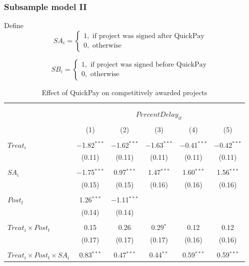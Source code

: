 \documentclass[
]{article}
\begin{document}
\hypertarget{subsample-model-ii}{%
\subsubsection{Subsample model II}\label{subsample-model-ii}}

Define
\[ SA_i = \begin{cases} 1, \text{ if project was signed after QuickPay}\\
0, \text{ otherwise} \end{cases}\]

\[ SB_i = \begin{cases} 1, \text{ if project was signed before QuickPay}\\
0, \text{ otherwise} \end{cases}\]

\begin{table}[H] \centering 
  \caption{Effect of QuickPay on competitively awarded projects} 
  \label{} 
\small 
\begin{tabular}{@{\extracolsep{-2pt}}lccccc} 
\\[-1.8ex]\hline 
\hline \\[-1.8ex] 
\\[-1.8ex] & \multicolumn{5}{c}{$PercentDelay_{it}$  } \\ 
\\[-1.8ex] & (1) & (2) & (3) & (4) & (5)\\ 
\hline \\[-1.8ex] 
 $Treat_i$ & $-$1.82$^{***}$ & $-$1.62$^{***}$ & $-$1.63$^{***}$ & $-$0.41$^{***}$ & $-$0.42$^{***}$ \\ 
  & (0.11) & (0.11) & (0.11) & (0.11) & (0.11) \\ 
  & & & & & \\ 
 $SA_i$ & $-$1.75$^{***}$ & 0.97$^{***}$ & 1.47$^{***}$ & 1.60$^{***}$ & 1.56$^{***}$ \\ 
  & (0.15) & (0.15) & (0.16) & (0.16) & (0.16) \\ 
  & & & & & \\ 
 $Post_t$ & 1.26$^{***}$ & $-$1.11$^{***}$ &  &  &  \\ 
  & (0.14) & (0.14) &  &  &  \\ 
  & & & & & \\ 
 $Treat_i \times Post_t$ & 0.15 & 0.26 & 0.29$^{*}$ & 0.12 & 0.12 \\ 
  & (0.17) & (0.17) & (0.17) & (0.16) & (0.16) \\ 
  & & & & & \\ 
 $Treat_i \times Post_t \times SA_i $ & 0.83$^{***}$ & 0.47$^{***}$ & 0.44$^{**}$ & 0.59$^{***}$ & 0.59$^{***}$ \\ 

\end{tabular}
\end{table}
\end{document}

